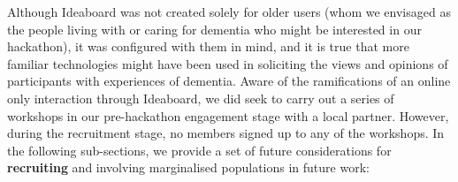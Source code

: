 Although Ideaboard was not created solely for older users (whom we envisaged as the people living with or caring for dementia who might be interested in our hackathon), it was configured with them in mind, and it is true that more familiar technologies might have been used in soliciting the views and opinions of participants with experiences of dementia.  Aware of the ramifications of an online only interaction through Ideaboard, we did seek to carry out a series of workshops in our pre-hackathon engagement stage with a local partner. However, during the recruitment stage, no members signed up to any of the workshops. In the following sub-sections, we provide a set of future considerations for \textbf{recruiting} and involving marginalised populations in future work:




